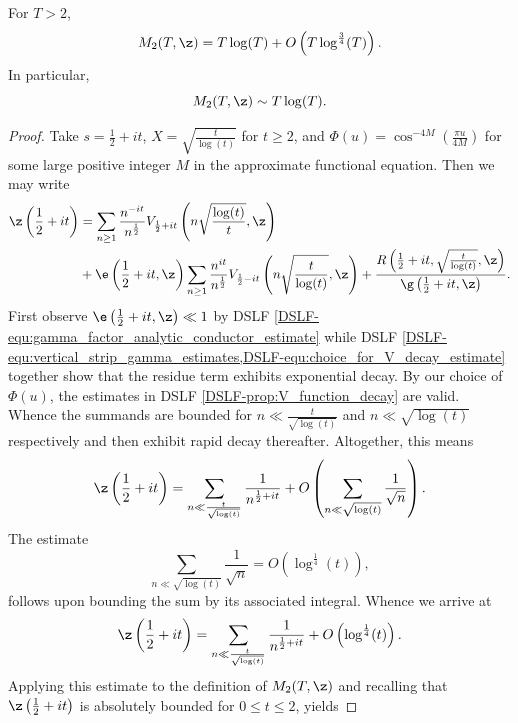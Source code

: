 \documentclass[12pt]{article}
\newcommand{\DSLFcref}[1]{DSLF \cref{#1}}
\begin{document}
      \begin{theorem}\label{thm:second_moment_of_Riemann_zeta_asymptotic_equivalence}
        For \(T > 2\),
        \[
          M_{2}(T,\z) = T\log(T)+O\left(T\log^{\frac{3}{4}}(T)\right).
        \]
        In particular,
        \[
          M_{2}(T,\z) \sim T\log(T).
        \]
      \end{theorem}
      \begin{proof}
        Take \(s = \frac{1}{2}+it\), \(X = \sqrt{\frac{t}{\log(t)}}\) for \(t \ge 2\), and \(\Phi(u) = \cos^{-4M}\left(\frac{\pi u}{4M}\right)\) for some large positive integer \(M\) in the approximate functional equation. Then we may write
        \begin{align*}
          \z\left(\frac{1}{2}+it\right) &= \sum_{n \ge 1}\frac{n^{-it}}{n^{\frac{1}{2}}}V_{\frac{1}{2}+it}\left(n\sqrt{\frac{\log(t)}{t}},\z\right) \\
          &+ \e\left(\frac{1}{2}+it,\z\right)\sum_{n \ge 1}\frac{n^{it}}{n^{\frac{1}{2}}}V_{\frac{1}{2}-it}\left(n\sqrt{\frac{t}{\log(t)}},\z\right)+\frac{R\left(\frac{1}{2}+it,\sqrt{\frac{t}{\log(t)}},\z\right)}{\g\left(\frac{1}{2}+it,\z\right)}.
        \end{align*}
        First observe \(\e\left(\frac{1}{2}+it,\z\right) \ll 1\) by \DSLFcref{DSLF-equ:gamma_factor_analytic_conductor_estimate} while \DSLFcref{DSLF-equ:vertical_strip_gamma_estimates,DSLF-equ:choice_for_V_decay_estimate} together show that the residue term exhibits exponential decay. By our choice of \(\Phi(u)\), the estimates in \DSLFcref{DSLF-prop:V_function_decay} are valid. Whence the summands are bounded for \(n \ll \frac{t}{\sqrt{\log(t)}}\) and \(n \ll \sqrt{\log(t)}\) respectively and then exhibit rapid decay thereafter. Altogether, this means
        \[
          \z\left(\frac{1}{2}+it\right) = \sum_{n \ll \frac{t}{\sqrt{\log(t)}}}\frac{1}{n^{\frac{1}{2}+it}}+O\left(\sum_{n \ll \sqrt{\log(t)}}\frac{1}{\sqrt{n}}\right).
        \]
        The estimate
        \[
          \sum_{n \ll \sqrt{\log(t)}}\frac{1}{\sqrt{n}} = O\left(\log^{\frac{1}{4}}(t)\right),
        \]
        follows upon bounding the sum by its associated integral. Whence we arrive at
        \begin{equation}\label{equ:second_moment_zeta_asymptotic_equivalence_1}
          \z\left(\frac{1}{2}+it\right) = \sum_{n \ll \frac{t}{\sqrt{\log(t)}}}\frac{1}{n^{\frac{1}{2}+it}}+O\left(\log^{\frac{1}{4}}(t)\right).
        \end{equation}
        Applying this estimate to the definition of \(M_{2}(T,\z)\) and recalling that \(\z\left(\frac{1}{2}+it\right)\) is absolutely bounded for \(0 \le t \le 2\), yields

\end{proof}
\end{document}

